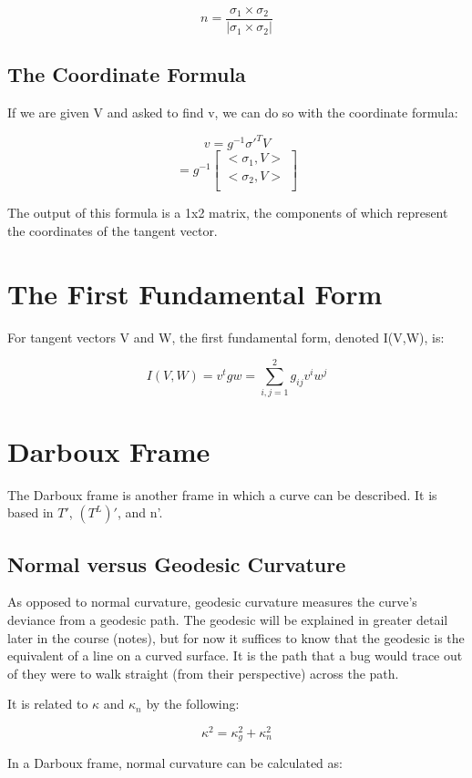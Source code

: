 \documentclass{article}
\begin{document}
\[ n = \frac{\sigma_1 \times \sigma_2}{|\sigma_1 \times \sigma_2|}\]

\subsection{The Coordinate Formula}

If we are given V and asked to find v, we can do so with the coordinate formula:

\[v = g^{-1}\sigma'^TV \]
\[ = g^{-1}
\begin{bmatrix}
<\sigma_1, V>\\
<\sigma_2, V>\\
\end{bmatrix}
\]

The output of this formula is a 1x2 matrix, the components of which represent the coordinates of the tangent vector.

\section{The First Fundamental Form}
For tangent vectors V and W, the first fundamental form, denoted I(V,W), is:

\[I(V,W) = v^t g w = \sum_{i,j=1}^{2} g_{ij} v^i w^j\]

\section{Darboux Frame}

The Darboux frame is another frame in which a curve can be described. It is based in $T'$, $(T^L)'$, and n'.

\subsection{Normal versus Geodesic Curvature}

As opposed to normal curvature, geodesic curvature measures the curve's deviance from a geodesic path. The geodesic will be explained in greater detail later in the course (notes), but for now it suffices to know that the geodesic is the equivalent of a line on a curved surface. It is the path that a bug would trace out of they were to walk straight (from their perspective) across the path.

It is related to $\kappa$ and $\kappa_{n}$ by the following:

\[\kappa^2 = \kappa_{g}^2 + \kappa_{n}^2\]

In a Darboux frame, normal curvature can be calculated as:
\end{document}
